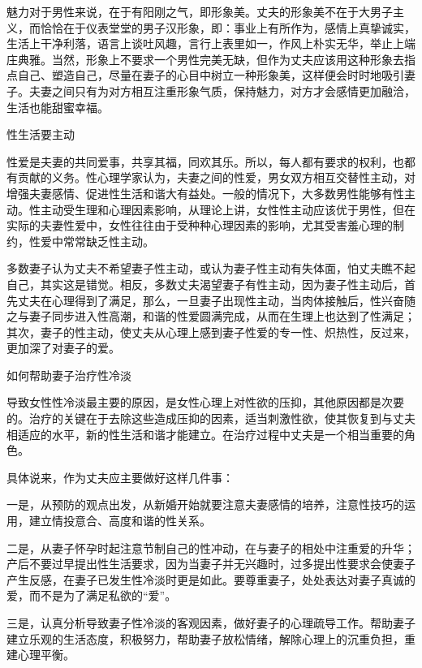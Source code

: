 \documentclass[12pt,UTF8]{ctexbook}
\begin{document}
魅力对于男性来说，在于有阳刚之气，即形象美。丈夫的形象美不在于大男子主义，而恰恰在于仪表堂堂的男子汉形象，即：事业上有所作为，感情上真挚诚实，生活上干净利落，语言上谈吐风趣，言行上表里如一，作风上朴实无华，举止上端庄典雅。当然，形象上不要求一个男性完美无缺，但作为丈夫应该用这种形象去指点自己、塑造自己，尽量在妻子的心目中树立一种形象美，这样便会时时地吸引妻子。夫妻之间只有为对方相互注重形象气质，保持魅力，对方才会感情更加融洽，生活也能甜蜜幸福。





性生活要主动


性爱是夫妻的共同爱事，共享其福，同欢其乐。所以，每人都有要求的权利，也都有贡献的义务。性心理学家认为，夫妻之间的性爱，男女双方相互交替性主动，对增强夫妻感情、促进性生活和谐大有益处。一般的情况下，大多数男性能够有性主动。性主动受生理和心理因素影响，从理论上讲，女性性主动应该优于男性，但在实际的夫妻性爱中，女性往往由于受种种心理因素的影响，尤其受害羞心理的制约，性爱中常常缺乏性主动。

多数妻子认为丈夫不希望妻子性主动，或认为妻子性主动有失体面，怕丈夫瞧不起自己，其实这是错觉。相反，多数丈夫渴望妻子有性主动，因为妻子性主动后，首先丈夫在心理得到了满足，那么，一旦妻子出现性主动，当肉体接触后，性兴奋随之与妻子同步进入性高潮，和谐的性爱圆满完成，从而在生理上也达到了性满足；其次，妻子的性主动，使丈夫从心理上感到妻子性爱的专一性、炽热性，反过来，更加深了对妻子的爱。





如何帮助妻子治疗性冷淡


导致女性性冷淡最主要的原因，是女性心理上对性欲的压抑，其他原因都是次要的。治疗的关键在于去除这些造成压抑的因素，适当刺激性欲，使其恢复到与丈夫相适应的水平，新的性生活和谐才能建立。在治疗过程中丈夫是一个相当重要的角色。

具体说来，作为丈夫应主要做好这样几件事：

一是，从预防的观点出发，从新婚开始就要注意夫妻感情的培养，注意性技巧的运用，建立情投意合、高度和谐的性关系。

二是，从妻子怀孕时起注意节制自己的性冲动，在与妻子的相处中注重爱的升华；产后不要过早提出性生活要求，因为当妻子并无兴趣时，过多提出性要求会使妻子产生反感，在妻子已发生性冷淡时更是如此。要尊重妻子，处处表达对妻子真诚的爱，而不是为了满足私欲的“爱”。

三是，认真分析导致妻子性冷淡的客观因素，做好妻子的心理疏导工作。帮助妻子建立乐观的生活态度，积极努力，帮助妻子放松情绪，解除心理上的沉重负担，重建心理平衡。
\end{document}
